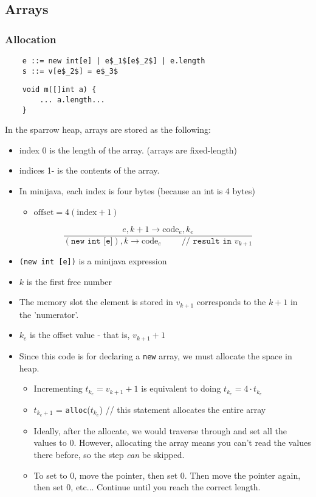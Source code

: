 \documentclass[10pt]{article}
\begin{document}
\subsection*{Arrays}
\subsubsection*{Allocation}
\begin{lstlisting}
    e ::= new int[e] | e$_1$[e$_2$] | e.length
    s ::= v[e$_2$] = e$_3$
\end{lstlisting}

\begin{lstlisting}
    void m([]int a) {
        ... a.length...
    }
\end{lstlisting}
In the sparrow heap, arrays are stored as the following:
\begin{itemize}
    \item index 0 is the length of the array.  (arrays are fixed-length)
    \item indices 1- is the contents of the array.
    \item In minijava, each index is four bytes (because an int is 4 bytes)
    \begin{itemize}
        \item $\text{offset} = 4(\text{index} + 1)$
    \end{itemize}
\end{itemize}

\[\frac{e, k + 1 \rightarrow \text{code}_e, k_e}{(\texttt{new int [e]}), k \rightarrow \text{code}_e \hspace{1cm}\texttt{// result in }v_{k + 1}}\]
\begin{itemize}
    \item \texttt{(new int [e])} is a minijava expression
    \item $k$ is the first free number
    \item The memory slot the element is stored in $v_{k + 1}$ corresponds to the $k + 1$ in the 'numerator'.
    \item $k_e$ is the offset value - that is, $v_{k + 1} + 1$
    \item Since this code is for declaring a \texttt{new} array, we must allocate the space in heap.
    \begin{itemize}
        \item Incrementing $t_{k_e} = v_{k + 1} + 1$ is equivalent to doing $t_{k_e} = 4 \cdot t_{k_e}$
        \item $t_{k_e + 1}$ = \texttt{alloc}($t_{k_e}$) // this statement allocates the entire array
        \item Ideally, after the allocate, we would traverse through and set all the values to 0.  However, allocating the array means you can't read the values there before, so the step \textit{can} be skipped.
        \item To set to 0, move the pointer, then set 0.  Then move the pointer again, then set 0, etc...  Continue until you reach the correct length.
    \end{itemize}  
\end{itemize}   
\end{document}

